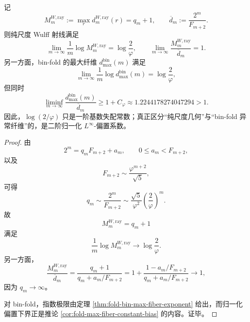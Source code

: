 \begin{theorem}[一阶指数普适而二阶归一化偏置分离]\label{thm:xi-time-part9xaab-wulff-ray-first-second-order-separation}
记
\[
M_m^{W,\mathrm{ray}}
:=
\max_{r}d_m^{W,\mathrm{ray}}(r)=q_m+1,
\qquad
\overline d_m:=\frac{2^m}{F_{m+2}}.
\]
则纯尺度 Wulff 射线满足
\[
\lim_{m\to\infty}\frac{1}{m}\log M_m^{W,\mathrm{ray}}
=
\log\frac{2}{\varphi},
\qquad
\lim_{m\to\infty}\frac{M_m^{W,\mathrm{ray}}}{\overline d_m}=1.
\]
另一方面，bin-fold 的最大纤维 \(d_{\max}^{\mathrm{bin}}(m)\) 满足
\[
\lim_{m\to\infty}\frac{1}{m}\log d_{\max}^{\mathrm{bin}}(m)
=
\log\frac{2}{\varphi},
\]
但同时
\[
\liminf_{m\to\infty}\frac{d_{\max}^{\mathrm{bin}}(m)}{\overline d_m}
\ge
1+C_\varphi
\approx
1.2244178274047294
>1.
\]
因此，\(\log(2/\varphi)\) 只是一阶基数失配常数；真正区分“纯尺度几何”与“bin-fold 异常纤维”的，是二阶归一化 \(L^\infty\)-偏置系数。
\end{theorem}
\begin{proof}
由
\[
2^m=q_mF_{m+2}+a_m,
\qquad
0\le a_m<F_{m+2},
\]
以及
\[
F_{m+2}\sim \frac{\varphi^{m+2}}{\sqrt5},
\]
可得
\[
q_m
\sim
\frac{2^m}{F_{m+2}}
\sim
\frac{\sqrt5}{\varphi^2}\left(\frac{2}{\varphi}\right)^m.
\]
故
\[
M_m^{W,\mathrm{ray}}=q_m+1
\]
满足
\[
\frac{1}{m}\log M_m^{W,\mathrm{ray}}\to \log\frac{2}{\varphi}.
\]
另一方面，
\[
\frac{M_m^{W,\mathrm{ray}}}{\overline d_m}
=
\frac{q_m+1}{q_m+a_m/F_{m+2}}
=
1+\frac{1-a_m/F_{m+2}}{q_m+a_m/F_{m+2}}
\longrightarrow 1,
\]
因为 \(q_m\to\infty\)。

对 bin-fold，指数极限由定理 \ref{thm:fold-bin-max-fiber-exponent} 给出，而归一化偏置下界正是推论 \ref{cor:fold-max-fiber-constant-bias} 的内容。证毕。
\end{proof}

